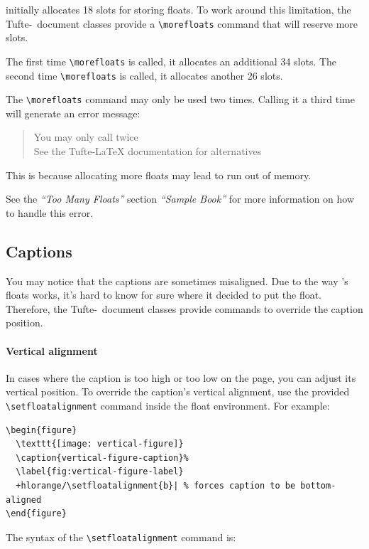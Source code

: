 \documentclass[a4paper]{tufte-handout}
\newcommand{\TL}{Tufte-\hologo{LaTeX}\xspace}
\newcommand{\hlorange}[1]{\textcolor{tufte-orange}{#1}}
\newcommand{\doccmd}[1]{\hlorange{\texttt{\textbackslash#1}}}
\newenvironment{docspec}
  {\begin{quotation}\ttfamily\parskip0pt\parindent0pt\ignorespaces}
  {\end{quotation}}
\begin{document}
 initially allocates 18 slots for storing floats. 
To work around this limitation, the \TL\ document classes provide a \doccmd{morefloats} command that will reserve more slots.

The first time \doccmd{morefloats} is called, it allocates an additional 34 slots.
The second time \doccmd{morefloats} is called, it allocates another 26 slots.

The \doccmd{morefloats} command may only be used two times.
Calling it a third time will generate an error message:
\begin{docspec}
  You may only call \string\morefloats\space twice\\
  See the Tufte-LaTeX documentation for alternatives
\end{docspec}
This is because allocating more floats may lead  to run out of memory.

See the \textit{``Too Many Floats''} section \textit{``Sample Book''} for more information on how to handle this error.

\subsection{Captions}\label{ssec:captions}
You may notice that the captions are sometimes misaligned.
Due to the way 's floats works, it's hard to know for sure where it decided to put the float.
Therefore, the \TL\ document classes provide commands to override the caption position.

\paragraph{Vertical alignment}\label{par:vertical-alignment}
In cases where the caption is too high or too low on the page, you can adjust its vertical position.
To override the caption's vertical alignment, use the provided \doccmd{setfloatalignment} command inside the float environment.
For example:

\begin{Verbatim}[commandchars=+/|]
\begin{figure}
  \texttt{[image: vertical-figure]}
  \caption{vertical-figure-caption}%
  \label{fig:vertical-figure-label}
  +hlorange/\setfloatalignment{b}| % forces caption to be bottom-aligned
\end{figure}
\end{Verbatim}

\noindent The syntax of the \doccmd{setfloatalignment} command is:
\end{document}
